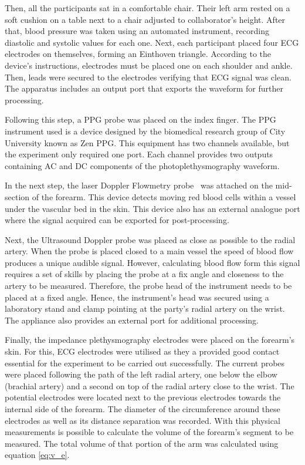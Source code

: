 Then, all the participants sat in a comfortable chair. Their left arm rested on a soft cushion on a table next to a chair adjusted to collaborator's height. After that, blood pressure was taken using an automated instrument, recording diastolic and systolic values for each one. Next, each participant placed four ECG electrodes on themselves, forming an Einthoven triangle. According to the device's instructions, electrodes must be placed one on each shoulder and ankle. Then, leads were secured to the electrodes verifying that ECG signal was clean. The apparatus includes an output port that exports the waveform for further processing. 

Following this step, a PPG probe was placed on the index finger. The PPG instrument used is a device designed by the biomedical research group of City University known as Zen PPG. This equipment has two channels available, but the experiment only required one port. Each channel provides two outputs containing AC and DC components of the photoplethysmography waveform. 


In the next step, the laser Doppler Flowmetry probe~\cite{moor:LDF2} was attached on the mid-section of the forearm. This device detects moving red blood cells within a vessel under the vascular bed in the skin. This device also has an external analogue port where the signal acquired can be exported for post-processing.  

Next, the Ultrasound Doppler probe was placed as close as possible to the radial artery. When the probe is placed closed to a main vessel the speed of blood flow produces a unique audible signal. However, calculating blood flow form this signal requires a set of skills by placing the probe at a fix angle and closeness to the artery to be measured. Therefore, the probe head of the instrument needs to be placed at a fixed angle. Hence, the instrument's head was secured using a laboratory stand and clamp pointing at the party's radial artery on the wrist. The appliance also provides an external port for additional processing.  

Finally, the impedance plethysmography electrodes were placed on the forearm's skin. For this, ECG electrodes were utilised as they a provided good contact essential for the experiment to be carried out successfully. The current probes were placed following the path of the left radial artery, one below the elbow (brachial artery) and a second on top of the radial artery close to the wrist. The potential electrodes were located next to the previous electrodes towards the internal side of the forearm. The diameter of the circumference around these electrodes as well as its distance separation was recorded. With this physical measurements is possible to calculate the volume of the forearm's segment to be measured. The total volume of that portion of the arm was calculated using equation \ref{eq:v_e}.

